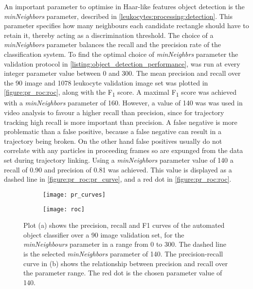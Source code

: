 An important parameter to optimise in Haar-like features object detection is the \emph{minNeighbors} parameter, described in \autoref{leukocytes:processing:detection}. This parameter specifies how many neighbours each candidate rectangle should have to retain it, thereby acting as a discrimination threshold. The choice of a \emph{minNeighbors} parameter balances the recall and the precision rate of the classification system. To find the optimal choice of \emph{minNeighbrs} parameter the validation protocol in \autoref{listing:object_detection_performance}, was run at every integer parameter value between 0 and 300. The mean precision and recall over the 90 image and 1078 leukocyte validation image set was plotted in \autoref{figure:pr_roc:roc}, along with the F\textsubscript{1} score. A maximal F\textsubscript{1} score was achieved with a \emph{minNeighbors} parameter of 160. However, a value of 140 was was used in video analysis to favour a higher recall than precision, since for trajectory tracking high recall is more important than precision. A false negative is more problematic than a false positive, because a false negative can result in a trajectory being broken. On the other hand false positives usually do not correlate with any particles in proceeding frames so are expunged from the data set during trajectory linking. Using a \emph{minNeighbors} parameter value of 140 a recall of 0.90 and precision of 0.81 was achieved. This value is displayed as a dashed line in \autoref{figure:pr_roc:pr_curve}, and a red dot in \autoref{figure:pr_roc:roc}.

\begin{figure}[htbp]{}
	\centering
	\begin{subfigure}[b]{0.72\linewidth}
		\texttt{[image: pr\_curves]}
		\caption{}
		\label{figure:pr_roc:pr_curve}
	\end{subfigure}
	\begin{subfigure}[b]{0.74\linewidth}
		\texttt{[image: roc]}
		\caption{}
		\label{figure:pr_roc:roc}
	\end{subfigure}
\caption[Precision, recall and F\textsubscript{1} score over parameter range]{Plot (a) shows the precision, recall and F1 curves of the automated object classifier over a 90 image validation set, for the \emph{minNeighbours} parameter in a range from 0 to 300. The dashed line is the selected \emph{minNeighbors} parameter of 140. The precision-recall curve in (b) shows the relationship between precision and recall over the parameter range. The red dot is the chosen parameter value of 140.}
\label{figure:pr_roc}
\end{figure}

